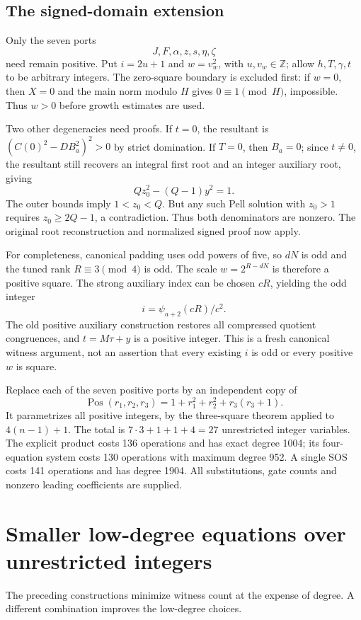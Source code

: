 \documentclass[11 pt]{article}
\begin{document}
\subsection{The signed-domain extension}
Only the seven ports
\[
J,F,\alpha,z,s,\eta,\zeta
\]
need remain positive. Put $ i=2 u+1 $ and $ w=v_w^2 $, with $ u,v_w\in\mathbb Z $; allow $ h,T,\gamma,t $ to be arbitrary integers.
The zero-square boundary is excluded first: if $ w=0 $, then $ X=0 $ and the main norm modulo $ H $ gives $ 0\equiv 1\pmod H $, impossible. Thus $ w>0 $ before growth estimates are used.

Two other degeneracies need proofs. If $ t=0 $, the resultant is
$(C(0)^2-DB_a^2)^2>0 $ by strict domination. If $ T=0 $, then $ B_a=0 $; since $ t\ne 0 $, the resultant still recovers an integral first root and an integer auxiliary root, giving
\[
Qz_0^2-(Q-1)y^2=1.
\]
The outer bounds imply $ 1<z_0<Q $. But any such Pell solution with $ z_0>1 $ requires $ z_0\ge 2 Q-1 $, a contradiction. Thus both denominators are nonzero. The original root reconstruction and normalized signed proof now apply.

For completeness, canonical padding uses odd powers of five, so $ dN $ is odd and the tuned rank $ R\equiv 3\pmod 4 $ is odd. The scale
$ w=2^{R-dN}$ is therefore a positive square. The strong auxiliary index can be chosen $ cR $, yielding the odd integer
\[
i=\psi_{a+2}(cR)/c^2.
\]
The old positive auxiliary construction restores all compressed quotient congruences, and $ t=M\tau+y $ is a positive integer. This is a fresh canonical witness argument, not an assertion that every existing $ i $ is odd or every positive $ w $ is square.

Replace each of the seven positive ports by an independent copy of
\[
\operatorname{Pos}(r_1,r_2,r_3)=1+r_1^2+r_2^2+r_3(r_3+1).
\]
It parametrizes all positive integers, by the three-square theorem applied to $ 4(n-1)+1 $. The total is
$ 7\cdot 3+1+1+4=27 $ unrestricted integer variables. The explicit product costs 136 operations and has exact degree 1004; its four-equation system costs 130 operations with maximum degree 952. A single SOS costs 141 operations and has degree 1904. All substitutions, gate counts and nonzero leading coefficients are supplied.

\section{Smaller low-degree equations over unrestricted integers}
The preceding constructions minimize witness count at the expense of degree. A different combination improves the low-degree choices.
\end{document}

